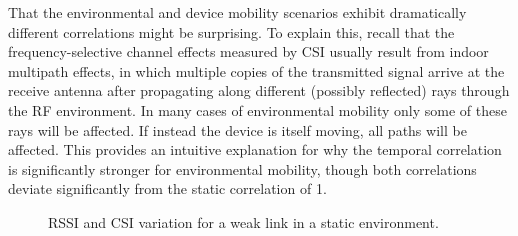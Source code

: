 That the environmental and device mobility scenarios exhibit dramatically different correlations might be surprising. To explain this, recall that the frequency-selective channel effects measured by CSI usually result from indoor multipath effects, in which multiple copies of the transmitted signal arrive at the receive antenna after propagating along different (possibly reflected) rays through the RF environment. In many cases of environmental mobility only some of these rays will be affected. If instead the device is itself moving, all paths will be affected. This provides an intuitive explanation for why the temporal correlation is significantly stronger for environmental mobility, though both correlations deviate significantly from the static correlation of 1.

\begin{figure}[tp]
	\centering
	\hspace{0.03\textwidth}%
	\caption[RSSI and CSI variation for a weak link in a static environment]{\label{fig:mobility_example_weak}RSSI and CSI variation for a weak link in a static environment.}
\end{figure}

